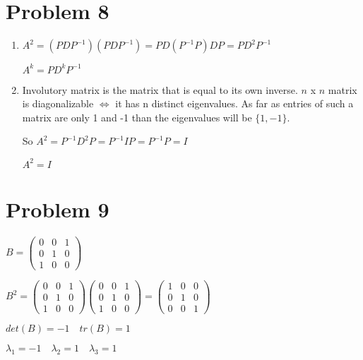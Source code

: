 \documentclass[12pt,letterpaper]{article}
\begin{document}
\section*{Problem 8}
\begin{enumerate}[label=(\alph*)]
    \item
    
    $A^2 = (PDP^{-1})(PDP^{-1}) = PD(P^{-1}P)DP = PD^2P^{-1}$
    
    $A^k = PD^kP^{-1}$
    
    \item
    
    Involutory matrix is the matrix that is equal to its own inverse.
    $n$ x $n$ matrix is diagonalizable $\iff$ it has n distinct eigenvalues.
    As far as entries of such a matrix are only 1 and -1 than the eigenvalues will be \in $\{1, -1\}$.
    
    So $A^2 = P^{-1}D^2P = P^{-1}IP = P^{-1}P = I$
    
    $A^2 = I$
\end{enumerate}

\section*{Problem 9}
$B = \begin{pmatrix}
            0 & 0 & 1 \\
            0 & 1 & 0 \\
            1 & 0 & 0
        \end{pmatrix}$
        
$B^2 = \begin{pmatrix}
            0 & 0 & 1 \\
            0 & 1 & 0 \\
            1 & 0 & 0
        \end{pmatrix}\begin{pmatrix}
            0 & 0 & 1 \\
            0 & 1 & 0 \\
            1 & 0 & 0
        \end{pmatrix} = \begin{pmatrix}
            1 & 0 & 0 \\
            0 & 1 & 0 \\
            0 & 0 & 1
        \end{pmatrix}$
        
$det(B) = -1 \quad tr(B) = 1$

$\lambda_1 = -1\quad\lambda_2 = 1\quad\lambda_3 = 1$
\end{document}
